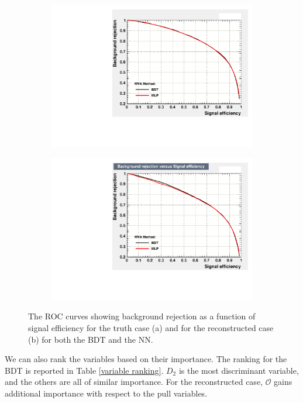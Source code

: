 \documentclass[10pt,a4paper]{book}
\begin{document}
\begin{figure}[h]
\begin{subfigure}{1.0\textwidth}
\centering
\includegraphics[scale=0.7]{truth/roc}
\caption{}
\end{subfigure}
\begin{subfigure}{1.0\textwidth}
\centering
\includegraphics[scale=0.7]{reco/roc}
\caption{}
\end{subfigure}
\caption{The ROC curves showing background rejection as a function of signal efficiency for the truth case (a) and for the reconstructed case (b) for both the BDT and the NN.}
\label{ROC curves}
\end{figure} 

We can also rank the variables based on their importance. The ranking for the BDT is reported in Table \ref{variable ranking}. $D_2$ is the most discriminant variable, and the others are all of similar importance. For the reconstructed case, $\mathcal{O}$ gains additional importance with respect to the pull variables.
\end{document}
